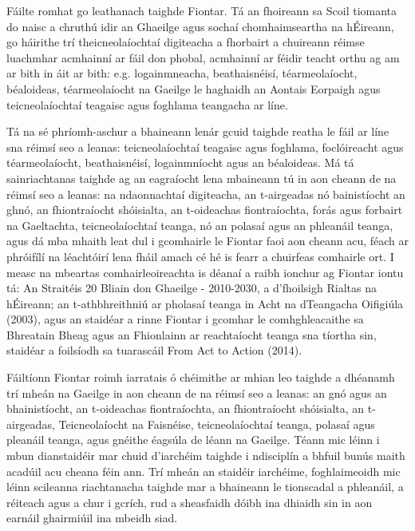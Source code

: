 \documentclass{minimal}
\begin{document}
F\'ailte romhat go leathanach taighde Fiontar. T\'a an fhoireann sa Scoil tiomanta do naisc a chruth\'u idir an Ghaeilge agus socha\'{i} chomhaimseartha na h\'Eireann, go h\'airithe tr\'{i} theicneola\'{i}ochta\'{i} digiteacha a fhorbairt a chuireann r\'eimse luachmhar acmhainn\'{i} ar f\'ail don phobal, acmhainn\'{i} ar f\'eidir teacht orthu ag am ar bith in \'ait ar bith: e.g. logainmneacha, beathaisn\'eis\'{i}, t\'earmeola\'{i}ocht, b\'ealoideas, t\'earmeola\'{i}ocht na Gaeilge le haghaidh an Aontais Eorpaigh agus teicneola\'{i}ochta\'{i} teagaisc agus foghlama teangacha ar l\'{i}ne.

T\'a na s\'e phr\'{i}omh-aschur a bhaineann len\'ar gcuid taighde reatha le f\'ail ar l\'{i}ne sna r\'eims\'{i} seo a leanas: teicneola\'{i}ochta\'{i} teagaisc agus foghlama, focl\'oireacht agus t\'earmeola\'{i}ocht, beathaisn\'eis\'{i}, logainmn\'{i}ocht agus an b\'ealoideas. M\'a t\'a sainriachtanas taighde ag an eagra\'{i}ocht lena mbaineann t\'u in aon cheann de na r\'eims\'{i} seo a leanas: na ndaonnachta\'{i} digiteacha, an t-airgeadas n\'o bainist\'{i}ocht an ghn\'o, an fhiontra\'{i}ocht sh\'oisialta, an t-oideachas fiontra\'{i}ochta, for\'as agus forbairt na Gaeltachta, teicneola\'{i}ochta\'{i} teanga, n\'o an polasa\'{i} agus an phlean\'ail teanga, agus d\'a mba mhaith leat dul i gcomhairle le Fiontar faoi aon cheann acu, f\'each ar phr\'oif\'{i}l\'{i} na l\'eacht\'oir\'{i} lena fh\'ail amach c\'e h\'e is fearr a chuirfeas comhairle ort. I measc na mbeartas comhairleoireachta is d\'eana\'{i} a raibh ionchur ag Fiontar iontu t\'a: An Strait\'eis 20 Bliain don Ghaeilge - 2010-2030, a d'fhoilsigh Rialtas na h\'Eireann; an t-athbhreithni\'u ar pholasa\'{i} teanga in Acht na dTeangacha Oifigi\'ula (2003), agus an staid\'ear a rinne Fiontar i gcomhar le comhghleacaithe sa Bhreatain Bheag agus an Fhionlainn ar reachta\'{i}ocht teanga sna t\'{i}ortha sin, staid\'ear a foils\'{i}odh sa tuarasc\'ail From Act to Action (2014).

F\'ailt\'{i}onn Fiontar roimh iarratais \'o ch\'eimithe ar mhian leo taighde a dh\'eanamh tr\'{i} mhe\'an na Gaeilge in aon cheann de na r\'eims\'{i} seo a leanas: an gn\'o agus an bhainist\'{i}ocht, an t-oideachas fiontra\'{i}ochta, an fhiontra\'{i}ocht sh\'oisialta, an t-airgeadas, Teicneola\'{i}ocht na Faisn\'eise, teicneola\'{i}ochta\'{i} teanga, polasa\'{i} agus plean\'ail teanga, agus gn\'eithe \'eags\'ula de l\'eann na Gaeilge. T\'eann mic l\'einn i mbun dianstaid\'eir mar chuid d'iarch\'eim taighde i ndiscipl\'{i}n a bhfuil bun\'us maith acad\'uil acu cheana f\'ein ann. Tr\'{i} mhe\'an an staid\'eir iarch\'eime, foghlaimeoidh mic l\'einn scileanna riachtanacha taighde mar a bhaineann le tionscadal a phlean\'ail, a r\'eiteach agus a chur i gcr\'{i}ch, rud a sheasfaidh d\'oibh ina dhiaidh sin in aon earn\'ail ghairmi\'uil ina mbeidh siad.
\end{document}
